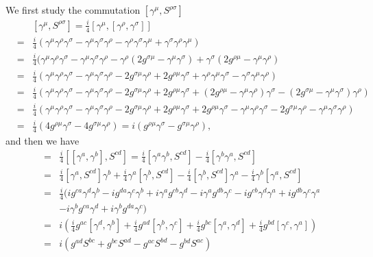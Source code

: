 \documentclass[11pt]{article}
\begin{document}
\section{ }
We first study the commutation $[\gamma^\mu, S^{\rho \sigma}]$
\begin{eqnarray}
  &&[\gamma^\mu, S^{\rho \sigma}] = \frac{i}{4}[\gamma^\mu, [\gamma^\rho,\gamma^\sigma]] \nonumber \\
  &=&\frac{i}{4}( \gamma^\mu \gamma^\rho \gamma^\sigma - \gamma^\mu \gamma^\sigma \gamma^\rho -\gamma^\rho \gamma^\sigma \gamma^\mu  +  \gamma^\sigma \gamma^\rho \gamma^\mu ) \nonumber\\
  &=& \frac{i}{4}( \gamma^\mu \gamma^\rho \gamma^\sigma - \gamma^\mu \gamma^\sigma \gamma^\rho -\gamma^\rho (2g^{\sigma \mu} -\gamma^\mu \gamma^\sigma ) +  \gamma^\sigma (2g^{\rho \mu} - \gamma^\mu \gamma^\rho) \nonumber\\
  &=& \frac{i}{4} ( \gamma^\mu \gamma^\rho \gamma^\sigma - \gamma^\mu \gamma^\sigma \gamma^\rho -2g^{\sigma \mu}\gamma^\rho + 2g^{\rho \mu} \gamma^\sigma +\gamma^\rho \gamma^\mu \gamma^\sigma -\gamma^\sigma \gamma^\mu \gamma^\rho)\nonumber\\
  &=& \frac{i}{4} ( \gamma^\mu \gamma^\rho \gamma^\sigma - \gamma^\mu \gamma^\sigma \gamma^\rho -2g^{\sigma \mu}\gamma^\rho + 2g^{\rho \mu} \gamma^\sigma +(2g^{\rho\mu}- \gamma^\mu \gamma^\rho) \gamma^\sigma -(2g^{\sigma\mu} -\gamma^\mu \gamma^\sigma )\gamma^\rho)\nonumber\\
  &=& \frac{i}{4} ( \gamma^\mu \gamma^\rho \gamma^\sigma - \gamma^\mu \gamma^\sigma \gamma^\rho -2g^{\sigma \mu}\gamma^\rho + 2g^{\rho \mu} \gamma^\sigma +2g^{\rho\mu}\gamma^\sigma- \gamma^\mu \gamma^\rho \gamma^\sigma -2g^{\sigma\mu} \gamma^\rho -\gamma^\mu \gamma^\sigma \gamma^\rho)\nonumber\\
  &=& \frac{i}{4} (4g^{\rho\mu}\gamma^\sigma-4g^{\sigma\mu}\gamma^\rho)=i (g^{\rho\mu}\gamma^\sigma-g^{\sigma\mu}\gamma^\rho),
\end{eqnarray}
and then we have
\begin{eqnarray}
  [S^{ab},S^{cd}]&=&\frac{i}{4} [[\gamma^a,\gamma^b],S^{cd}]=\frac{i}{4}[\gamma^a\gamma^b,S^{cd}]-\frac{i}{4}[\gamma^b\gamma^a,S^{cd}] \\
  &=&\frac{i}{4} [\gamma^a,S^{cd}]\gamma^b+\frac{i}{4}\gamma^a[\gamma^b,S^{cd}]-\frac{i}{4} [\gamma^b,S^{cd}]\gamma^a-\frac{i}{4}\gamma^b[\gamma^a,S^{cd}] \\
  &=& \frac{i}{4}(ig^{ca}\gamma^d\gamma^b-ig^{da}\gamma^c\gamma^b+i\gamma^ag^{cb}\gamma^d-i\gamma^ag^{db}\gamma^c-ig^{cb}\gamma^d\gamma^a+ig^{db}\gamma^c\gamma^a\nonumber\\&&-i\gamma^bg^{ca}\gamma^d+i\gamma^bg^{da}\gamma^c) \\
  &=&i(\frac{i}{4}g^{ac}[\gamma^d,\gamma^b]+\frac{i}{4}g^{ad}[\gamma^b,\gamma^c]+\frac{i}{4}g^{bc}[\gamma^a,\gamma^d]+\frac{i}{4}g^{bd}[\gamma^c,\gamma^a]) \\
  &=&i( g^{ad} S^{bc} + g^{bc} S^{ad} - g^{ac} S^{bd} - g^{bd} S^{ac})
\end{eqnarray}
\end{document}
